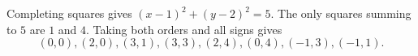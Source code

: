 Completing squares gives $(x-1)^2+(y-2)^2=5$. The only squares summing to $5$ are $1$ and $4$. Taking both orders and all signs gives
\[
\boxed{(0,0),(2,0),(3,1),(3,3),(2,4),(0,4),(-1,3),(-1,1)}.
\]
